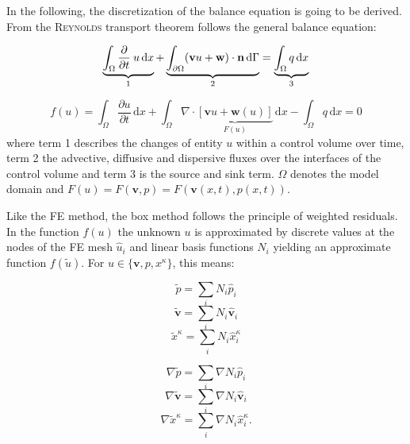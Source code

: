 In the following, the discretization of the balance equation is going to be derived.
From the \textsc{Reynolds} transport theorem follows the general balance equation:

\begin{equation}
  \underbrace{\int_\Omega \frac{\partial}{\partial t} \: u \, \mathrm{d}x}_{1}
  + \underbrace{\int_{\partial\Omega} (\mathbf{v} u + \mathbf w) \cdot \textbf n \, \mathrm{d}\Gamma}_{2} = \underbrace{\int_\Omega q \, \mathrm{d}x}_{3}
\end{equation}

\begin{equation}
  f(u) = \int_\Omega \frac{\partial u}{\partial t} \, \mathrm{d}x + \int_{\Omega} \nabla \cdot
  \underbrace{\left[  \mathbf{v} u + \mathbf w(u)\right] }_{F(u)}  \, \mathrm{d}x - \int_\Omega q \, \mathrm{d}x = 0
\end{equation}
where term 1 describes the changes of entity $u$ within a control volume over
time, term 2 the advective, diffusive and dispersive fluxes over the interfaces
of the control volume and term 3 is the source and sink term. $\Omega$ denotes the
model domain and $F(u) = F(\mathbf v, p) = F(\mathbf v(x,t), p(x,t))$.

Like the FE method, the box method follows the principle of weighted residuals.
In the function $f(u)$ the unknown $u$ is approximated by discrete values at the
nodes of the FE mesh $\hat u_i$ and linear basis functions $N_i$ yielding an
approximate function $f(\tilde u)$. For $u\in \lbrace \mathbf v, p, x^\kappa \rbrace$, this means:

\begin{minipage}[b]{0.47\textwidth}
\begin{equation}
\label{eq:p}
  \tilde p = \sum_i N_i \hat{p}_i
\end{equation}
\begin{equation}
\label{eq:v}
  \tilde{\mathbf v} = \sum_i N_i \hat{\mathbf v}_i
\end{equation}
\begin{equation}
\label{eq:x}
  \tilde x^\kappa  = \sum_i N_i \hat x_i^\kappa
\end{equation}
\end{minipage}
\hfill
\begin{minipage}[b]{0.47\textwidth}
\begin{equation}
\label{eq:dp}
  \nabla \tilde p = \sum_i \nabla N_i \hat{p}_i
\end{equation}
\begin{equation}
\label{eq:dv}
  \nabla \tilde{\mathbf v} = \sum_i \nabla N_i \hat{\mathbf v}_i
\end{equation}
\begin{equation}
\label{eq:dx}
  \nabla \tilde x^\kappa  = \sum_i \nabla N_i \hat x_i^\kappa .
\end{equation}
\end{minipage}

